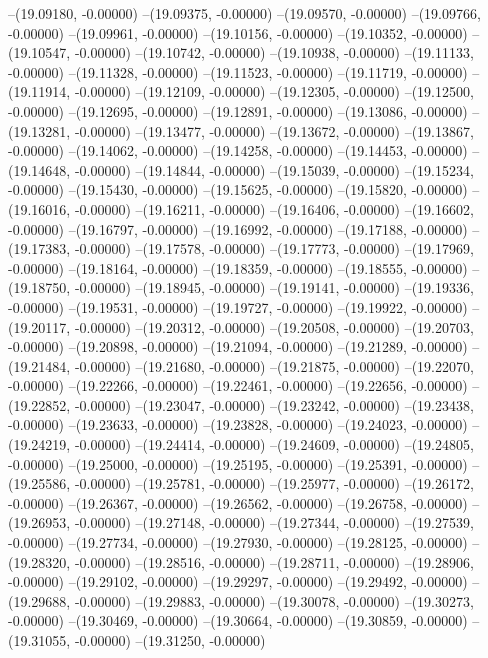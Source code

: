 --(19.09180, -0.00000)
--(19.09375, -0.00000)
--(19.09570, -0.00000)
--(19.09766, -0.00000)
--(19.09961, -0.00000)
--(19.10156, -0.00000)
--(19.10352, -0.00000)
--(19.10547, -0.00000)
--(19.10742, -0.00000)
--(19.10938, -0.00000)
--(19.11133, -0.00000)
--(19.11328, -0.00000)
--(19.11523, -0.00000)
--(19.11719, -0.00000)
--(19.11914, -0.00000)
--(19.12109, -0.00000)
--(19.12305, -0.00000)
--(19.12500, -0.00000)
--(19.12695, -0.00000)
--(19.12891, -0.00000)
--(19.13086, -0.00000)
--(19.13281, -0.00000)
--(19.13477, -0.00000)
--(19.13672, -0.00000)
--(19.13867, -0.00000)
--(19.14062, -0.00000)
--(19.14258, -0.00000)
--(19.14453, -0.00000)
--(19.14648, -0.00000)
--(19.14844, -0.00000)
--(19.15039, -0.00000)
--(19.15234, -0.00000)
--(19.15430, -0.00000)
--(19.15625, -0.00000)
--(19.15820, -0.00000)
--(19.16016, -0.00000)
--(19.16211, -0.00000)
--(19.16406, -0.00000)
--(19.16602, -0.00000)
--(19.16797, -0.00000)
--(19.16992, -0.00000)
--(19.17188, -0.00000)
--(19.17383, -0.00000)
--(19.17578, -0.00000)
--(19.17773, -0.00000)
--(19.17969, -0.00000)
--(19.18164, -0.00000)
--(19.18359, -0.00000)
--(19.18555, -0.00000)
--(19.18750, -0.00000)
--(19.18945, -0.00000)
--(19.19141, -0.00000)
--(19.19336, -0.00000)
--(19.19531, -0.00000)
--(19.19727, -0.00000)
--(19.19922, -0.00000)
--(19.20117, -0.00000)
--(19.20312, -0.00000)
--(19.20508, -0.00000)
--(19.20703, -0.00000)
--(19.20898, -0.00000)
--(19.21094, -0.00000)
--(19.21289, -0.00000)
--(19.21484, -0.00000)
--(19.21680, -0.00000)
--(19.21875, -0.00000)
--(19.22070, -0.00000)
--(19.22266, -0.00000)
--(19.22461, -0.00000)
--(19.22656, -0.00000)
--(19.22852, -0.00000)
--(19.23047, -0.00000)
--(19.23242, -0.00000)
--(19.23438, -0.00000)
--(19.23633, -0.00000)
--(19.23828, -0.00000)
--(19.24023, -0.00000)
--(19.24219, -0.00000)
--(19.24414, -0.00000)
--(19.24609, -0.00000)
--(19.24805, -0.00000)
--(19.25000, -0.00000)
--(19.25195, -0.00000)
--(19.25391, -0.00000)
--(19.25586, -0.00000)
--(19.25781, -0.00000)
--(19.25977, -0.00000)
--(19.26172, -0.00000)
--(19.26367, -0.00000)
--(19.26562, -0.00000)
--(19.26758, -0.00000)
--(19.26953, -0.00000)
--(19.27148, -0.00000)
--(19.27344, -0.00000)
--(19.27539, -0.00000)
--(19.27734, -0.00000)
--(19.27930, -0.00000)
--(19.28125, -0.00000)
--(19.28320, -0.00000)
--(19.28516, -0.00000)
--(19.28711, -0.00000)
--(19.28906, -0.00000)
--(19.29102, -0.00000)
--(19.29297, -0.00000)
--(19.29492, -0.00000)
--(19.29688, -0.00000)
--(19.29883, -0.00000)
--(19.30078, -0.00000)
--(19.30273, -0.00000)
--(19.30469, -0.00000)
--(19.30664, -0.00000)
--(19.30859, -0.00000)
--(19.31055, -0.00000)
--(19.31250, -0.00000)
